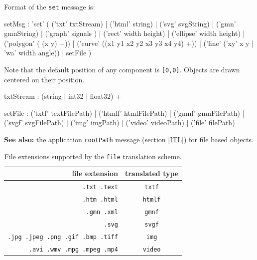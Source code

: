 \documentclass[a4paper,twoside]{report}
\newcommand{\OSC}[1]		{\texttt{#1}}
\newcommand{\values}[1]	{\texttt{#1}}
\renewcommand{\seealso}	{\textbf{See also: }}
\begin{document}
Format of the \OSC{set} message is:
\begin{rail}
setMsg : 'set' (
	('txt' txtStream) |
	('html' string) |
	('svg' svgString) |
	('gmn' gmnString) |
	('graph' signals ) |
	('rect' width height) |
	('ellipse' width height) |
	('polygon' ( (x y) +)) |
	('curve' ((x1 y1 x2 y2 x3 y3 x4 y4) +)) |
	('line' ('xy' x y | 'wa' width angle)) |
	setFile
)
\end{rail}

Note that the default position of any component is \values{[0,0]}. Objects are drawn centered on their position.

\begin{rail}
txtStream :  (string | int32 | float32) +
\end{rail}

\label{setfile}
\begin{rail}
setFile : 
	('txtf' textFilePath) |
	('htmlf' htmlFilePath) |
	('gmnf' gmnFilePath) |
	('svgf' svgFilePath) |
	('img' imgPath) |
	('video' videoPath) |
	('file' filePath)
\end{rail}

\seealso the application \OSC{rootPath} message (section \ref{ITL}) for file based objects.

\begin{table}[htdp]
\caption{File extensions supported by the \OSC{file} translation scheme.}
\begin{center}
\begin{tabular}{|r|c|}
\hline
file extension & translated type \\
\hline
\OSC{.txt .text}		& \OSC{txtf} \\
\OSC{.htm .html}		& \OSC{htmlf} \\
\OSC{.gmn .xml}		& \OSC{gmnf} \\
\OSC{.svg} 			& \OSC{svgf} \\
\OSC{.jpg .jpeg .png .gif .bmp .tiff} & \OSC{img} \\
\OSC{.avi .wmv .mpg .mpeg .mp4} & \OSC{video} \\
\hline
\end{tabular}
\end{center}
\label{fileTranslate}
\end{table}
\end{document}
